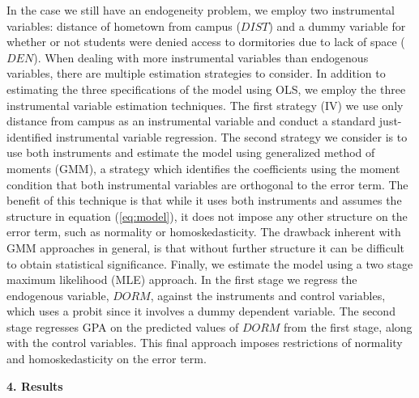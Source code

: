 \documentclass[12pt]{article}
\begin{document}
In the case we still have an endogeneity problem, we employ two instrumental variables: distance of hometown from campus ($DIST$) and a dummy variable for whether or not students were denied access to dormitories due to lack of space ($DEN$).  When dealing with more instrumental variables than endogenous variables, there are multiple estimation strategies to consider.  In addition to estimating the three specifications of the model using OLS, we employ the three instrumental variable estimation techniques.  The first strategy (IV) we use only distance from campus as an instrumental variable and conduct a standard just-identified instrumental variable regression.  The second strategy we consider is to use both instruments and estimate the model using generalized method of moments (GMM), a strategy which identifies the coefficients using the moment condition that both instrumental variables are orthogonal to the error term.  The benefit of this technique is that while it uses both instruments and assumes the structure in equation (\ref{eq:model}), it does not impose any other structure on the error term, such as normality or homoskedasticity.  The drawback inherent with GMM approaches in general, is that without further structure it can be difficult to obtain statistical significance.  Finally, we estimate the model using a two stage maximum likelihood (MLE) approach.  In the first stage we regress the endogenous variable, $DORM$, against the instruments and control variables, which uses a probit since it involves a dummy dependent variable.  The second stage regresses GPA on the predicted values of $DORM$ from the first stage, along with the control variables.  This final approach imposes restrictions of normality and homoskedasticity on the error term. 

\begin{center}\textbf{4. Results}\end{center}
\end{document}
